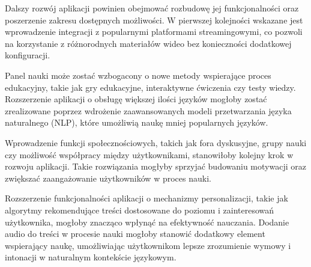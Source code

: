 Dalszy rozwój aplikacji powinien obejmować rozbudowę jej funkcjonalności oraz poszerzenie zakresu dostępnych możliwości. W pierwszej kolejności wskazane jest wprowadzenie integracji z popularnymi platformami streamingowymi, co pozwoli na korzystanie z różnorodnych materiałów wideo bez konieczności dodatkowej konfiguracji.

Panel nauki może zostać wzbogacony o nowe metody wspierające proces edukacyjny, takie jak gry edukacyjne, interaktywne ćwiczenia czy testy wiedzy. Rozszerzenie aplikacji o obsługę większej ilości języków mogłoby zostać zrealizowane poprzez wdrożenie zaawansowanych modeli przetwarzania języka naturalnego (NLP), które umożliwią naukę mniej popularnych języków.

Wprowadzenie funkcji społecznościowych, takich jak fora dyskusyjne, grupy nauki czy możliwość współpracy między użytkownikami, stanowiłoby kolejny krok w rozwoju aplikacji. Takie rozwiązania mogłyby sprzyjać budowaniu motywacji oraz zwiększać zaangażowanie użytkowników w proces nauki.

Rozszerzenie funkcjonalności aplikacji o mechanizmy personalizacji, takie jak algorytmy rekomendujące treści dostosowane do poziomu i zainteresowań użytkownika, mogłoby znacząco wpłynąć na efektywność nauczania. Dodanie audio do treści w procesie nauki mogłoby stanowić dodatkowy element wspierający naukę, umożliwiając użytkownikom lepsze zrozumienie wymowy i intonacji w naturalnym kontekście językowym.

